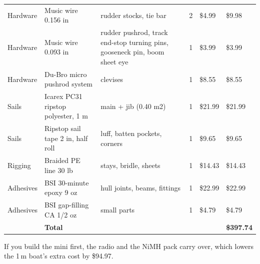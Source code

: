 \documentclass[11pt]{article}
\begin{document}
{\begin{longtable}{p{1.5cm}p{4.3cm}p{5.0cm}cp{1.2cm}p{1.2cm}}
Hardware & Music wire 0.156 in & rudder stocks, tie bar & 2 & \$4.99 & \$9.98 \\
Hardware & Music wire 0.093 in & rudder pushrod, track end-stop turning pins, gooseneck pin, boom sheet eye & 1 & \$3.99 & \$3.99 \\
Hardware & Du-Bro micro pushrod system & clevises & 1 & \$8.55 & \$8.55 \\
Sails & Icarex PC31 ripstop polyester, 1 m & main + jib (0.40 m2) & 1 & \$21.99 & \$21.99 \\
Sails & Ripstop sail tape 2 in, half roll & luff, batten pockets, corners & 1 & \$9.65 & \$9.65 \\
Rigging & Braided PE line 30 lb & stays, bridle, sheets & 1 & \$14.43 & \$14.43 \\
Adhesives & BSI 30-minute epoxy 9 oz & hull joints, beams, fittings & 1 & \$22.99 & \$22.99 \\
Adhesives & BSI gap-filling CA 1/2 oz & small parts & 1 & \$4.79 & \$4.79 \\
\midrule
& \textbf{Total} & & & & \textbf{\$397.74} \\
\bottomrule
\end{longtable}}
If you build the mini first, the radio and the NiMH pack carry over, which lowers the 1\,m boat's extra cost by \$94.97.
\end{document}
